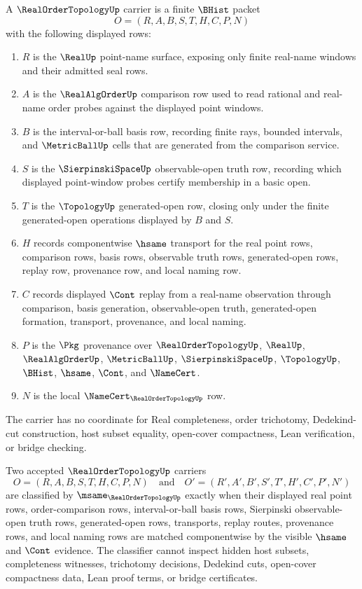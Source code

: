 \begin{definition}
\label{def:real-order-topology-carrier}
A $\RealOrderTopologyUp$ carrier is a finite $\BHist$ packet
$$
O=(R,A,B,S,T,H,C,P,N)
$$
with the following displayed rows:
\begin{enumerate}
\item $R$ is the $\RealUp$ point-name surface, exposing only finite real-name windows and their admitted seal rows.
\item $A$ is the $\RealAlgOrderUp$ comparison row used to read rational and real-name order probes against the displayed point windows.
\item $B$ is the interval-or-ball basis row, recording finite rays, bounded intervals, and $\MetricBallUp$ cells that are generated from the comparison service.
\item $S$ is the $\SierpinskiSpaceUp$ observable-open truth row, recording which displayed point-window probes certify membership in a basic open.
\item $T$ is the $\TopologyUp$ generated-open row, closing only under the finite generated-open operations displayed by $B$ and $S$.
\item $H$ records componentwise $\hsame$ transport for the real point rows, comparison rows, basis rows, observable truth rows, generated-open rows, replay row, provenance row, and local naming row.
\item $C$ records displayed $\Cont$ replay from a real-name observation through comparison, basis generation, observable-open truth, generated-open formation, transport, provenance, and local naming.
\item $P$ is the $\Pkg$ provenance over $\RealOrderTopologyUp$, $\RealUp$, $\RealAlgOrderUp$, $\MetricBallUp$, $\SierpinskiSpaceUp$, $\TopologyUp$, $\BHist$, $\hsame$, $\Cont$, and $\NameCert$.
\item $N$ is the local $\NameCert_{\RealOrderTopologyUp}$ row.
\end{enumerate}
The carrier has no coordinate for Real completeness, order trichotomy, Dedekind-cut construction, host subset equality, open-cover compactness, Lean verification, or bridge checking.
\end{definition}

\begin{definition}
\label{def:real-order-topology-classifier}
Two accepted $\RealOrderTopologyUp$ carriers
$$
O=(R,A,B,S,T,H,C,P,N)
\quad\text{and}\quad
O'=(R',A',B',S',T',H',C',P',N')
$$
are classified by $\msame_{\RealOrderTopologyUp}$ exactly when their displayed real point rows, order-comparison rows, interval-or-ball basis rows, Sierpinski observable-open truth rows, generated-open rows, transports, replay routes, provenance rows, and local naming rows are matched componentwise by the visible $\hsame$ and $\Cont$ evidence. The classifier cannot inspect hidden host subsets, completeness witnesses, trichotomy decisions, Dedekind cuts, open-cover compactness data, Lean proof terms, or bridge certificates.
\end{definition}

